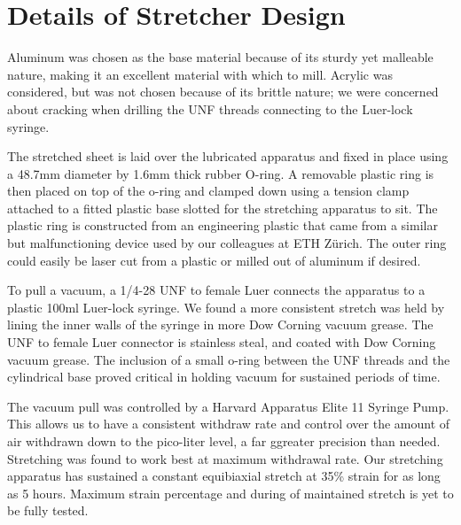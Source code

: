 \section{Details of Stretcher Design}

Aluminum was chosen as the base material because of its sturdy yet malleable nature, making it an excellent material with which to mill. Acrylic was considered, but was not chosen because of its brittle nature; we were concerned about cracking when drilling the UNF threads connecting to the Luer-lock syringe.

The stretched sheet is laid over the lubricated apparatus and fixed in place using a 48.7mm diameter by 1.6mm thick rubber O-ring. A removable plastic ring is then placed on top of the o-ring and clamped down using a tension clamp attached to a fitted plastic base slotted for the stretching apparatus to sit. The plastic ring is constructed from an engineering plastic that came from a similar but malfunctioning device used by our colleagues at ETH Zürich. The outer ring could easily be laser cut from a plastic or milled out of aluminum if desired. 

To pull a vacuum, a 1/4-28 UNF to female Luer connects the apparatus to a plastic 100ml Luer-lock syringe. We found a more consistent stretch was held by lining the inner walls of the syringe in more Dow Corning vacuum grease. The UNF to female Luer connector is stainless steal, and coated with Dow Corning vacuum grease. The inclusion of a small o-ring between the UNF threads and the cylindrical base proved critical in holding vacuum for sustained periods of time.

The vacuum pull was controlled by a Harvard Apparatus Elite 11 Syringe Pump. This allows us to have a consistent withdraw rate and control over the amount of air withdrawn down to the pico-liter level, a far ggreater precision than needed. Stretching was found to work best at maximum withdrawal rate. Our stretching apparatus has sustained a constant equibiaxial stretch at 35\% strain for as long as 5 hours. Maximum strain percentage and during of maintained stretch is yet to be fully tested.


